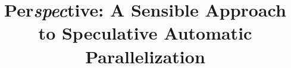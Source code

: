 \documentclass[pageno]{jpaper}
\begin{document}
 \title{
 Per\textit{spec}tive: A Sensible Approach to Speculative Automatic
Parallelization}

 \date{}
 \maketitle

 \thispagestyle{empty}

 
 
 
 
 
 
 
 

 
 


 
\end{document}
